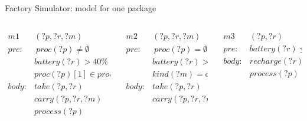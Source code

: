 \begin{frame}[fragile]{Factory Simulator: model for one package}
    \footnotesize
    \begin{columns}[t]
        \begin{column}{0.32\textwidth}
            \begin{align*}
                m1&(?p, ?r, ?m)\\
                pre: &\ proc(?p) \neq \emptyset \\
                 &battery(?r) > 40\% \\
                 &proc(?p)[1] \in proc(?m) \\
                 body:&take(?p,?r) \\
                     &carry(?p,?r,?m) \\
                     &process(?p)
            \end{align*}
        \end{column}
        \begin{column}{0.32\textwidth}
            \begin{align*}
                m2&(?p, ?r, ?m) \\
                pre: &\ proc(?p)  = \emptyset \\
                 &battery(?r) > 40\% \\
                 &kind(?m) = \text{output} \\
                 body:&take(?p,?r) \\
                     &carry(?p,?r,?m) \\
            \end{align*}
        \end{column}
        \begin{column}{0.32\textwidth}
            \begin{align*}
                m3&(?p, ?r) \\ 
                pre: &battery(?r) \leq 40\% \\
                 body:&recharge(?r) \\
                     &process(?p)
            \end{align*}
        \end{column}
    \end{columns}
    
\end{frame}

